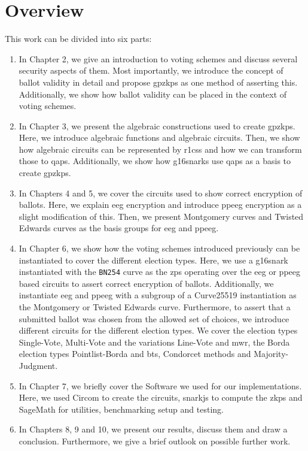 \section*{Overview}

This work can be divided into six parts:
\begin{enumerate}
    \item In Chapter 2, we give an introduction to voting schemes and discuss several security aspects of them.
    Most importantly, we introduce the concept of ballot validity in detail and propose \glspl{gpzkp} as one method of asserting this.
    Additionally, we show how ballot validity can be placed in the context of voting schemes.
    \item In Chapter 3, we present the algebraic constructions used to create \glspl{gpzkp}. 
    Here, we introduce algebraic functions and algebraic circuits.
    Then, we show how algebraic circuits can be represented by \glspl{r1cs} and how we can transform those to \glspl{qap}.
    Additionally, we show how \glspl{g16snark} use \glspl{qap} as a basis to create \glspl{gpzkp}.
    \item In Chapters 4 and 5, we cover the circuits used to show correct encryption of ballots.
    Here, we explain \gls{eeg} encryption and introduce \gls{ppeeg} encryption as a slight modification of this.
    Then, we present Montgomery curves and Twisted Edwards curves as the basis groups for \gls{eeg} and \gls{ppeeg}.
    \item In Chapter 6, we show how the voting schemes introduced previously can be instantiated to cover the different election types.
    Here, we use a \gls{g16snark} instantiated with the \verb|BN254| curve as the \gls{zps} operating over the \gls{eeg} or \gls{ppeeg} based circuits to assert correct encryption of ballots.
    Additionally, we instantiate \gls{eeg} and \gls{ppeeg} with a subgroup of a Curve25519 instantiation as the Montgomery or Twisted Edwards curve.
    Furthermore, to assert that a submitted ballot was chosen from the allowed set of choices, we introduce different circuits for the different election types.
    We cover the election types Single-Vote, Multi-Vote and the variations Line-Vote and \gls{mwr}, the Borda election types Pointlist-Borda and \gls{bts}, Condorcet methods and Majority-Judgment.
    \item In Chapter 7, we briefly cover the Software we used for our implementations.
    Here, we used Circom to create the circuits, snarkjs to compute the \glspl{zkp} and SageMath for utilities, benchmarking setup and testing.
    \item In Chapters 8, 9 and 10, we present our results, discuss them and draw a conclusion.
    Furthermore, we give a brief outlook on possible further work.
\end{enumerate}


